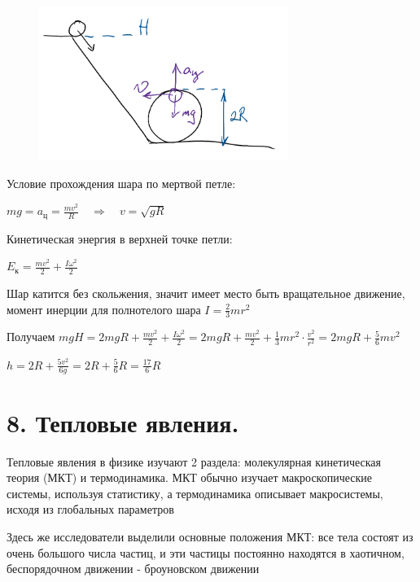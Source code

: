 \documentclass[12pt]{article}
\begin{document}
    \begin{minipage}{\textwidth}
        \begin{figure}
            \includegraphics[height=5cm]{physics1/images/physics1_2024_10_21_1}
        \end{figure}
        
        Условие прохождения шара по мертвой петле: 
        
        $mg = a_{\text{ц}} = \frac{mv^2}{R} \quad \Longrightarrow \quad v = \sqrt{gR}$

        Кинетическая энергия в верхней точке петли: 
        
        $E_\text{к} = \frac{mv^2}{2} + \frac{I\omega^2}{2}$

        Шар катится без скольжения, значит имеет место быть вращательное движение, момент инерции для полнотелого шара $I = \frac{2}{3}mr^2$

        Получаем $mgH = 2mgR + \frac{mv^2}{2} + \frac{I\omega^2}{2} = 2mgR + \frac{mv^2}{2} + \frac{1}{3}mr^2 \cdot \frac{v^2}{r^2} = 
        2mgR + \frac{5}{6}mv^2$

        $h = 2R + \frac{5v^2}{6g} = 2R + \frac{5}{6}R = \frac{17}{6}R$
    \end{minipage}


    \section{8. Тепловые явления.}

    Тепловые явления в физике изучают 2 раздела: молекулярная кинетическая теория (МКТ) и термодинамика. 
    МКТ обычно изучает макроскопические системы, используя статистику, а термодинамика описывает
    макросистемы, исходя из глобальных параметров

    Здесь же исследователи выделили основные положения МКТ: все тела состоят из очень большого числа частиц, 
    и эти частицы постоянно находятся в хаотичном, беспорядочном движении - броуновском движении
\end{document}
